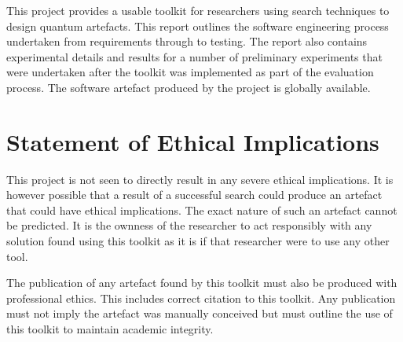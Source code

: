 This project provides a usable toolkit for researchers using search techniques to design quantum artefacts.
This report outlines the software engineering process undertaken from requirements through to testing.
The report also contains experimental details and results for a number of preliminary experiments that were undertaken after the toolkit was implemented as part of the evaluation process.
The software artefact produced by the project is globally available.

\section{Statement of Ethical Implications}
This project is not seen to directly result in any severe ethical implications.
It is however possible that a result of a successful search could produce an artefact that could have ethical implications.
The exact nature of such an artefact cannot be predicted.
It is the ownness of the researcher to act responsibly with any solution found using this toolkit as it is if that researcher were to use any other tool.

The publication of any artefact found by this toolkit must also be produced with professional ethics.
This includes correct citation to this toolkit.
Any publication must not imply the artefact was manually conceived but must outline the use of this toolkit to maintain academic integrity.

